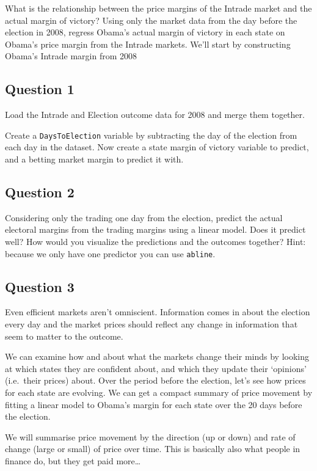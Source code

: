 \documentclass[]{article}
\begin{document}
What is the relationship between the price margins of the Intrade market
and the actual margin of victory? Using only the market data from the
day before the election in 2008, regress Obama's actual margin of
victory in each state on Obama's price margin from the Intrade markets.
We'll start by constructing Obama's Intrade margin from 2008

\subsection{Question 1}\label{question-1}

Load the Intrade and Election outcome data for 2008 and merge them
together.

Create a \texttt{DaysToElection} variable by subtracting the day of the
election from each day in the dataset. Now create a state margin of
victory variable to predict, and a betting market margin to predict it
with.

\subsection{Question 2}\label{question-2}

Considering only the trading one day from the election, predict the
actual electoral margins from the trading margins using a linear model.
Does it predict well? How would you visualize the predictions and the
outcomes together? Hint: because we only have one predictor you can use
\texttt{abline}.

\subsection{Question 3}\label{question-3}

Even efficient markets aren't omniscient. Information comes in about the
election every day and the market prices should reflect any change in
information that seem to matter to the outcome.

We can examine how and about what the markets change their minds by
looking at which states they are confident about, and which they update
their `opinions' (i.e.~their prices) about. Over the period before the
election, let's see how prices for each state are evolving. We can get a
compact summary of price movement by fitting a linear model to Obama's
margin for each state over the 20 days before the election.

We will summarise price movement by the direction (up or down) and rate
of change (large or small) of price over time. This is basically also
what people in finance do, but they get paid more\ldots{}
\end{document}
